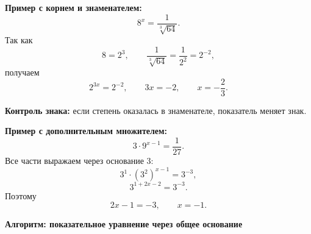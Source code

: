 \documentclass[a4paper,12pt]{article}
\newcommand{\keyidea}[1]{\textbf{\color{darkaccent}#1}}
\begin{document}
\textbf{Пример с корнем и знаменателем:}
\[
8^x=\frac1{\sqrt[3]{64}}.
\]
Так как
\[
8=2^3,
\qquad
\frac1{\sqrt[3]{64}}
=\frac1{2^2}=2^{-2},
\]
получаем
\[
2^{3x}=2^{-2},
\qquad
3x=-2,
\qquad
\boxed{x=-\frac23}.
\]

\keyidea{Контроль знака:}
если степень оказалась в знаменателе, показатель меняет знак.

\textbf{Пример с дополнительным множителем:}
\[
3\cdot9^{x-1}=\frac1{27}.
\]
Все части выражаем через основание $3$:
\[
3^1\cdot(3^2)^{x-1}=3^{-3},
\]
\[
3^{1+2x-2}=3^{-3}.
\]
Поэтому
\[
2x-1=-3,
\qquad
\boxed{x=-1}.
\]


\clearpage
\thispagestyle{empty}

\begin{center}
{\Large\bfseries\color{darkaccent}
Алгоритм: показательное уравнение через общее основание}
\end{center}

\vspace{2mm}
\end{document}
